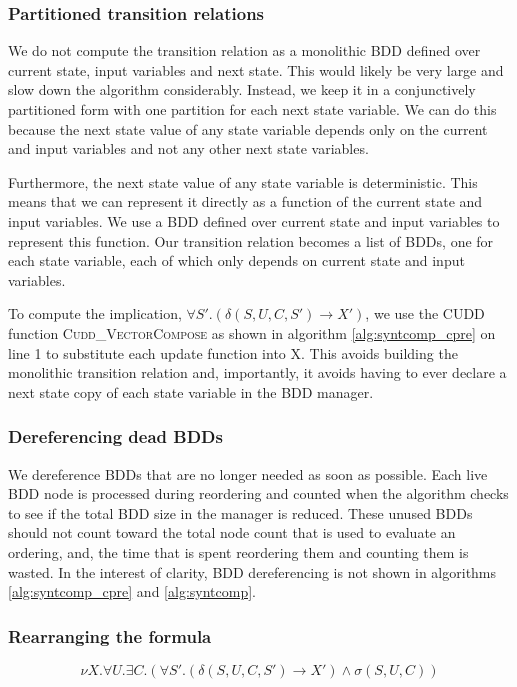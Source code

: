 \subsubsection{Partitioned transition relations}
We do not compute the transition relation as a monolithic BDD defined over current state, input variables and next state. This would likely be very large and slow down the algorithm considerably. Instead, we keep it in a conjunctively partitioned form with one partition for each next state variable. We can do this because the next state value of any state variable depends only on the current and input variables and not any other next state variables.

Furthermore, the next state value of any state variable is deterministic. This means that we can represent it directly as a function of the current state and input variables. We use a BDD defined over current state and input variables to represent this function. Our transition relation becomes a list of BDDs, one for each state variable, each of which only depends on current state and input variables. 

To compute the implication, $\forall S'. (\delta(S, U, C, S') \rightarrow X')$, we use the CUDD function \textsc{Cudd\_VectorCompose} as shown in algorithm \ref{alg:syntcomp_cpre} on line 1 to substitute each update function into X. This avoids building the monolithic transition relation and, importantly, it avoids having to ever declare a next state copy of each state variable in the BDD manager. 

\subsubsection{Dereferencing dead BDDs}
We dereference BDDs that are no longer needed as soon as possible. Each live BDD node is processed during reordering and counted when the algorithm checks to see if the total BDD size in the manager is reduced. These unused BDDs should not count toward the total node count that is used to evaluate an ordering, and, the time that is spent reordering them and counting them is wasted. In the interest of clarity, BDD dereferencing is not shown in algorithms \ref{alg:syntcomp_cpre} and \ref{alg:syntcomp}.

\subsubsection{Rearranging the formula}
\begin{equation}
\label{eqn:mu2}
\nu X. \forall U. \exists C. (\forall S'. (\delta(S, U, C, S') \rightarrow X') \wedge \sigma(S, U, C))
\end{equation}

